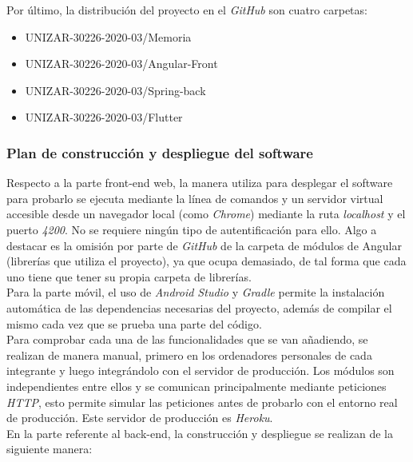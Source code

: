 \documentclass{article}
\begin{document}
\hfill \break
Por último, la distribución del proyecto en el \textit{GitHub} son cuatro carpetas:
\begin{itemize}
	\item UNIZAR-30226-2020-03/Memoria
	\item UNIZAR-30226-2020-03/Angular-Front
	\item UNIZAR-30226-2020-03/Spring-back
	\item UNIZAR-30226-2020-03/Flutter
\end{itemize}

\newpage
\subsubsection{Plan de construcción y despliegue del software}
Respecto a la parte front-end web, la manera utiliza para desplegar el software para probarlo se ejecuta mediante la línea de comandos y un servidor virtual accesible desde un navegador local (como \textit{Chrome}) mediante la ruta \textit{localhost} y el puerto \textit{4200}. No se requiere ningún tipo de autentificación para ello.
Algo a destacar es la omisión por parte de \textit{GitHub} de la carpeta de módulos de Angular (librerías que utiliza el proyecto), ya que ocupa demasiado, de tal forma que cada uno tiene que tener su propia carpeta de librerías.\\
\hfill \break
Para la parte móvil, el uso de \textit{Android Studio} y \textit{Gradle} permite la instalación automática de las dependencias necesarias del proyecto, además de compilar el mismo cada vez que se prueba una parte del código.\\
\hfill \break
Para comprobar cada una de las funcionalidades que se van añadiendo, se realizan de manera manual, primero en los ordenadores personales de cada integrante y luego integrándolo con el servidor de producción. 
Los módulos son independientes entre ellos y se comunican principalmente mediante peticiones \textit{HTTP}, esto permite simular las peticiones antes de probarlo con el entorno real de producción. 
Este servidor de producción es \textit{Heroku}. \\
\hfill \break
En la parte referente al back-end, la construcción y despliegue se realizan de la siguiente manera:
\end{document}
